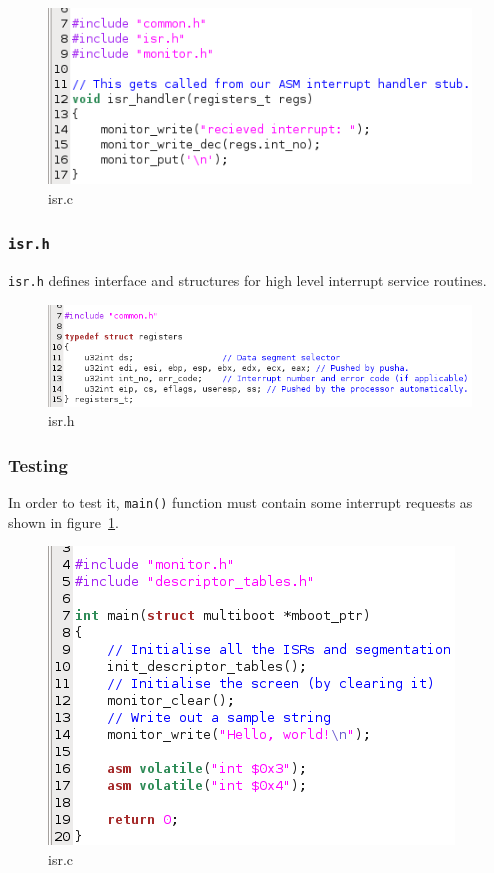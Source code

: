 \documentclass{report}
\begin{document}
\begin{figure}[hbtp]
\centering
\includegraphics[scale=0.4]{images/es02/isr_c.png}
\caption{isr.c}
\end{figure}

\subsubsection*{\texttt{isr.h}}
\texttt{isr.h} defines interface and structures for high level interrupt service routines.

\begin{figure}[hbtp]
\centering
\includegraphics[scale=0.4]{images/es02/isr_h.png}
\caption{isr.h}
\end{figure}

\subsubsection*{Testing}
In order to test it, \texttt{main()} function must contain some interrupt requests as shown in figure~\ref{isr_main}.

\begin{figure}[hbtp]
\centering
\includegraphics[scale=0.4]{images/es02/main.png}
\caption{isr.c}
\label{isr_main}
\end{figure}
\end{document}
